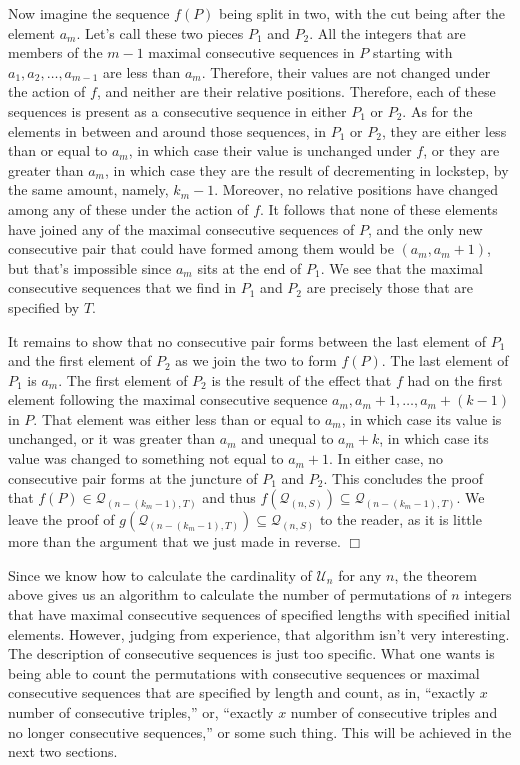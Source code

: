 \documentclass{article}
\def\endproof{\mbox{$\Box$} \par }     %
\begin{document}
Now imagine the sequence $f(P)$ being split in two, with the cut being after the element
$a_m$. Let's call these two pieces $P_1$ and $P_2$. All the integers that are members of the $m-1$ maximal
consecutive sequences in $P$ starting with $a_1, a_2, \ldots, a_{m-1}$ are less than $a_m$. Therefore,
their values are not changed under the action of $f$, and neither are their relative positions.
Therefore, each of these sequences is present as a consecutive sequence in either $P_1$ or $P_2$. 
As for the elements in between and around those sequences, in $P_1$ or $P_2$,
they are either less than or equal to $a_m$,
in which case their value is unchanged under $f$, or they are greater than $a_m$, in which case they are
the result of decrementing in lockstep, by the same amount, namely, $k_m -1$. Moreover, no relative positions
have changed among any of these under the action of $f$. It follows that none of these elements
have joined any of the maximal consecutive sequences of $P$, and the only new consecutive pair that
could have formed among them would be $(a_m, a_m+1)$, but that's impossible since $a_m$ sits at the
end of $P_1$. We see that the maximal consecutive sequences that we find in $P_1$ and $P_2$ are precisely those
that are specified by $T$.

It remains to show that no consecutive pair forms between the last element of $P_1$ and the first element of
$P_2$ as we join the two to form $f(P)$. The last element of $P_1$ is $a_m$. The first element of $P_2$ is
the result of the effect that $f$ had on the first element following the maximal consecutive sequence
$a_m, a_m + 1, \ldots, a_m + (k -1)$ in $P$. That element was either less than or equal to $a_m$, in which
case its value is unchanged, or it was greater than $a_m$ and unequal to $a_m + k$, in which case its value
was changed to something not equal to $a_m + 1$. In either case, no consecutive pair forms at the juncture
of $P_1$ and $P_2$. This concludes the proof that $f(P)\in {\mathcal Q}_{(n-(k_m-1),T)}$ and thus
$f({\mathcal Q}_{(n,S)}) \subseteq {\mathcal Q}_{(n-(k_m-1),T)}$. We leave the proof of
$g({\mathcal Q}_{(n-(k_m-1),T)}) \subseteq {\mathcal Q}_{(n,S)}$ to the reader, as it is little more than
the argument that we just made in reverse.
\endproof

Since we know how to calculate the cardinality of ${\mathcal U}_n$ for any $n$, the theorem above gives
us an algorithm to calculate the number of permutations of $n$ integers that have maximal consecutive
sequences of specified lengths with specified initial elements. However, judging from experience, that algorithm
isn't very interesting. The description of consecutive sequences is just too specific. What one wants
is being able to count the permutations with consecutive sequences or maximal consecutive sequences that
are specified by length and count, as in, ``exactly $x$ number of consecutive triples,'' or, ``exactly
$x$ number of consecutive triples and no longer consecutive sequences,'' or some such thing. This will
be achieved in the next two sections.
\end{document}
